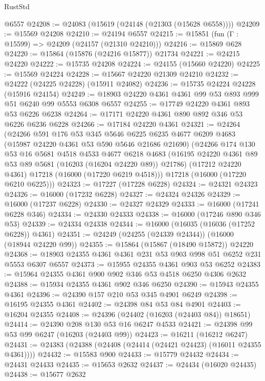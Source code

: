 \begin{lexlean}{RustStd}
\begin{coremodule}
    @6557
@24208 := @24083 (@15619 (@24148 (@21303 (@15628 @6558))))
@24209 := @15569 @24208
@24210 := @24194 @6557
@24215 := @15851 (fun (Γ : @15599) => @24209 (@24157 (@21310 @24210)))
@24216 := @15869 @628
@24220 := @15864 (@15876 (@24216 @15877)) @21734
@24221 := @24215 @24220
@24222 := @15735 @24208
@24224 := @24155 (@15660 @24220)
@24225 := @15569 @24224
@24228 := @15667 @24220 @21309 @24210
@24232 := @24222 (@24225 @24228) (@15911 @24082)
@24236 := @15735 @24224 @24228 (@15916 @24154)
@24249 := @18903 @24220 @4361 @4361 @99 @53 @893 @999 @51 @6240 @99 @5553 @6308 @6557
@24255 := @17749 @24220 @4361 @893 @53 @6226 @6238
@24264 := @17171 @24220 @4361 @890 @892 @346 @53 @6226 @6236 @6228
@24266 := @17184 @24220 @4361
@24321 := @24264
    (@24266
      @591
      @176
      @53
      @345
      @5646
      @6225
      @6235
      @4677
      @6209
      @4683
      (@15987 @24220 @4361 @53 @590 @5646 @21686 @21690)
      (@24266
        @174
        @130
        @53
        @16
        @5681
        @4518
        @4533
        @4677
        @6218
        @4683
        (@16195 @24220 @4361 @89 @53 @89 @5681 (@16203 (@16204 @24220 @89)) @21786)
        (@17212 @24220 @4361)
        @17218
        (@16000 (@17220 @6219 @4518)))
      @17218
      (@16000 (@17220 @6210 @6225)))
@24323 := @17227 (@17228 @6228)
@24324 := @24321 @24323
@24326 := @16000 (@17232 @6228)
@24327 := @24324 @24326
@24329 := @16000 (@17237 @6228)
@24330 := @24327 @24329
@24333 := @16000 (@17241 @6228 @346)
@24334 := @24330 @24333
@24338 := @16000 (@17246 @890 @346 @53)
@24339 := @24334 @24338
@24344 := @16000 (@16035 (@16036 (@17252 @6228)) @4361)
@24351 := @24249 (@24255 (@24339 @24344)) (@16000 (@18944 @24220 @99))
@24355 := @15864 (@15867 (@18490 @15872)) @24220
@24368 := @18903 @24355 @4361 @4361 @231 @53 @903 @998 @51 @6252 @231 @5553 @6307 @6557
@24373 := @15955 @24355 @4361 @903 @53 @6252
@24383 := @15964 @24355 @4361 @900 @902 @346 @53 @4518 @6250 @4306 @2632
@24388 := @15934 @24355 @4361 @902 @346 @6250
@24390 := @15943 @24355 @4361
@24396 := @24390 @157 @210 @53 @345 @4901 @6249
@24398 := @16195 @24355 @4361
@24402 := @24398 @84 @53 @84 @4901
@24403 := @16204 @24355
@24408 := @24396 (@24402 (@16203 (@24403 @84)) @18651)
@24414 := @24390 @208 @130 @53 @16 @6247 @4533
@24421 := @24398 @99 @53 @99 @6247 (@16203 (@24403 @99))
@24423 := @16211 (@16212 @6247)
@24431 := @24383 (@24388 (@24408 (@24414 (@24421 @24423) (@16011 @24355 @4361))))
@24432 := @15583 @900
@24433 := @15779 @24432
@24434 := @24431 @24433
@24435 := @15653 @2632
@24437 := @24434 (@16020 @24435)
@24438 := @15677 @2632

\end{coremodule}
\end{lexlean}
